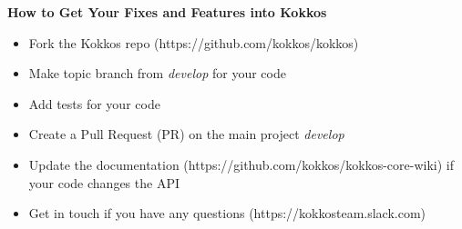 










\begin{frame}[fragile]

  \vspace{10pt}

  \textbf{How to Get Your Fixes and Features into Kokkos}
  \newline
  \begin{itemize}
    \item Fork the Kokkos repo (https://github.com/kokkos/kokkos)
    \item Make topic branch from \textit{develop} for your code
    \item Add tests for your code
    \item Create a Pull Request (PR) on the main project \textit{develop}
    \item Update the documentation (https://github.com/kokkos/kokkos-core-wiki) if your code changes the API
    \item Get in touch if you have any questions (https://kokkosteam.slack.com)
  \end{itemize}

\end{frame}



